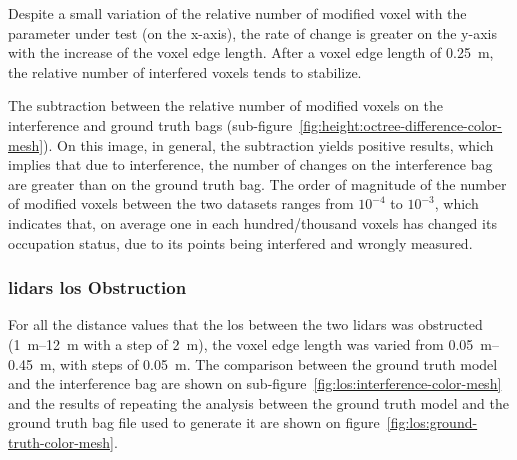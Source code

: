Despite a small variation of the relative number of modified voxel with the parameter under test (on the x-axis), the rate of change is greater on the y-axis with the increase of the voxel edge length. After a voxel edge length of \SI{0.25}{\meter}, the relative number of interfered voxels tends to stabilize. 

The subtraction between the relative number of modified voxels on the interference and ground truth bags (sub-figure~\ref{fig:height:octree-difference-color-mesh}). On this image, in general, the subtraction yields positive results, which implies that due to interference, the number of changes on the interference bag are greater than on the ground truth bag. The order of magnitude of the number of modified voxels between the two datasets ranges from $10^{-4}$ to $10^{-3}$, which indicates that, on average one in each hundred/thousand voxels has changed its occupation status, due to its points being interfered and wrongly measured.


\subsubsection{\acp{lidar} \ac{los} Obstruction}
For all the distance values that the \acf{los} between the two \acp{lidar} was obstructed (\SIrange{1}{12}{\meter} with a step of \SI{2}{\meter}), the voxel edge length was varied from \SIrange{0.05}{0.45}{\meter}, with steps of \SI{0.05}{\meter}. The comparison between the ground truth model and the interference bag are shown on sub-figure~\ref{fig:los:interference-color-mesh} and the results of repeating the analysis between the ground truth model and the ground truth bag file used to generate it are shown on figure~\ref{fig:los:ground-truth-color-mesh}.

